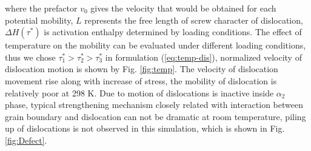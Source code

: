 \documentclass[materials,article,submit,moreauthors,pdftex,10pt,a4paper]{Definitions/mdpi}
\begin{document}
where the prefactor $v_0$ gives the velocity that would be obtained for each potential mobility, $L$ represents the free length of screw character of dislocation, $\Delta H(\tau^*)$ is activation enthalpy determined by loading conditions. The effect of temperature on the mobility can be evaluated under different loading conditions, thus we chose  $\tau_1^*>\tau_2^*>\tau_3^*$ in formulation (\ref{eq:temp-dis}), normalized velocity of dislocation motion is shown by Fig. \ref{fig:temp}. The  velocity  of dislocation movement rise along with increase of  stress, the mobility  of dislocation is relatively poor at 298 K. Due to motion of dislocations is inactive inside $\alpha_2$ phase,  typical strengthening mechanism closely related with interaction between grain boundary and dislocation can not be dramatic at room temperature, piling up of dislocations is not observed in this simulation, which is shown in Fig. \ref{fig:Defect}.
\end{document}

